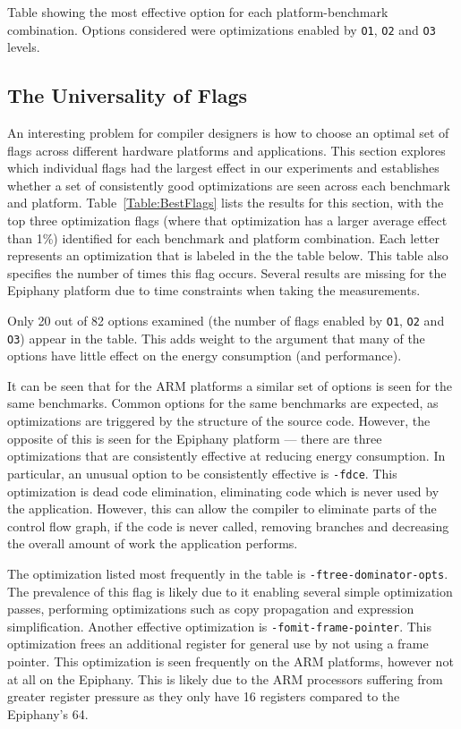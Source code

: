 \documentclass[twocolumn]{article}
\let\oldcaption\caption
\renewcommand{\caption}[1]{\oldcaption{\textup{#1}}}
\begin{document}
\begin{table}
	\caption{Table showing the most effective option for each platform-benchmark combination. Options considered were
	optimizations enabled by \texttt{O1}, \texttt{O2} and \texttt{O3} levels.}
	\label{Table:BestFlags}
\end{table}


\subsection{The Universality of Flags}

An interesting problem for compiler designers is how to choose an optimal set of flags across different hardware platforms and applications. This section explores which individual flags had the largest effect in our experiments and establishes whether a set of consistently good optimizations are seen across each benchmark and platform. Table~\ref{Table:BestFlags} lists the results for this section, with the top three optimization flags (where that optimization has a larger average effect than 1\%) identified for each benchmark and platform combination.  Each letter represents an optimization that is labeled in the the table below. This table also specifies the number of times this flag occurs. Several results are missing for the Epiphany platform due to time constraints when taking the measurements.

Only 20 out of 82 options examined (the number of flags enabled by \texttt{O1}, \texttt{O2} and \texttt{O3}) appear in the table. This adds weight to the argument that many of the options have little effect on the energy consumption (and performance).

It can be seen that for the ARM platforms a similar set of options is seen for the same benchmarks. Common options for the same benchmarks are expected, as optimizations are triggered by the structure of the source code. However, the opposite of this is seen for the Epiphany platform --- there are three optimizations that are consistently effective at reducing energy consumption. In particular, an unusual option to be consistently effective is \texttt{-fdce}. This optimization is dead code elimination, eliminating code which is never used by the application. However, this can allow the compiler to eliminate parts of the control flow graph, if the code is never called, removing branches and decreasing the overall amount of work the application performs.

The optimization listed most frequently in the table is \texttt{-ftree-dominator-opts}. The prevalence of this flag is likely due to it enabling several simple optimization passes, performing optimizations such as copy propagation and expression simplification. Another effective optimization is \texttt{-fomit-frame-pointer}. This optimization frees an additional register for general use by not using a frame pointer. This optimization is seen frequently on the ARM platforms, however not at all on the Epiphany. This is likely due to the ARM processors suffering from greater register pressure as they only have 16 registers compared to the Epiphany's 64.
\end{document}
